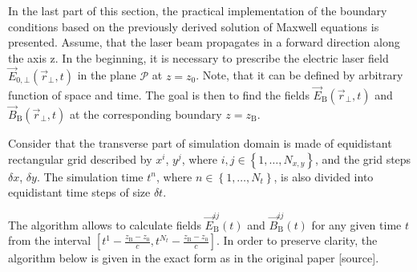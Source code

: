In the last part of this section, the practical implementation of the boundary conditions based on the previously derived solution of Maxwell equations is presented. Assume, that the laser beam propagates in a forward direction along the axis z. In the beginning, it is necessary to prescribe the electric laser field $ \vec{E}_{0, \bot} (\vec{r}_{\bot}, t) $ in the plane $ \mathcal{P} $ at $ z = z_0 $. Note, that it can be defined by arbitrary function of space and time. The goal is then to find the fields $ \vec{E}_{\mathrm{B}} (\vec{r}_{\bot}, t) $ and $ \vec{B}_{\mathrm{B}} (\vec{r}_{\bot}, t) $ at the corresponding boundary $ z = z_\mathrm{B} $.

Consider that the transverse part of simulation domain is made of equidistant rectangular grid described by $ x^{i} $, $ y^{j} $, where $ i, j \in \left\lbrace 1, \ldots, N_{x, y} \right\rbrace $, and the grid steps $ \delta x $, $\delta y $. The simulation time $ t^{n} $, where $ n \in \left\lbrace 1, \ldots, N_{t} \right\rbrace $, is also divided into equidistant time steps of size $ \delta t $.

The algorithm allows to calculate fields $ \vec{E}_{\mathrm{B}}^{ij} (t) $ and $ \vec{B}_{\mathrm{B}}^{ij} (t) $ for any given time $ t $ from the interval $ \left[ t^{1} - \frac{z_\mathrm{B} - z_0}{c}, t^{N_t} - \frac{z_\mathrm{B} - z_0}{c} \right] $. In order to preserve clarity, the algorithm below is given in the exact form as in the original paper [source].

